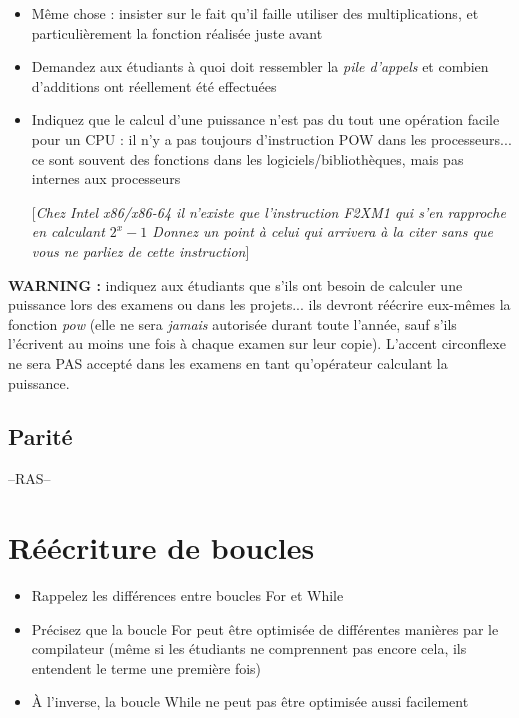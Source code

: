 \documentclass[11pt,a4paper]{article}
\begin{document}
\begin{itemize}
\item Même chose : insister sur le fait qu'il faille utiliser des multiplications, et particulièrement la fonction réalisée juste avant
\item Demandez aux étudiants à quoi doit ressembler la \textit{pile d'appels} et combien d'additions ont réellement été effectuées
\item Indiquez que le calcul d'une puissance n'est pas du tout une opération facile pour un CPU : il n'y a pas toujours d'instruction POW dans les processeurs... ce sont souvent des fonctions dans les logiciels/bibliothèques, mais pas internes aux processeurs

[\textit{Chez Intel x86/x86-64 il n'existe que l'instruction F2XM1 qui s'en rapproche en calculant $ 2^{x} - 1 $ Donnez un point à celui qui arrivera à la citer sans que vous ne parliez de cette instruction}]

\end{itemize}

\bigskip

\textbf{WARNING : } indiquez aux étudiants que s'ils ont besoin de calculer une puissance lors des examens ou dans les projets... ils devront réécrire eux-mêmes la fonction \textit{pow} (elle ne sera \textit{jamais} autorisée durant toute l'année, sauf s'ils l'écrivent au moins une fois à chaque examen sur leur copie).
L'accent circonflexe ne sera PAS accepté dans les examens en tant qu'opérateur calculant la puissance.

\bigskip


\subsection{Parité}

--RAS--

\clearpage


\section{Réécriture de boucles}

\begin{itemize}
\item Rappelez les différences entre boucles For et While
\item Précisez que la boucle For peut être optimisée de différentes manières par le compilateur (même si les étudiants ne comprennent pas encore cela, ils entendent le terme une première fois)
\item \`A l'inverse, la boucle While ne peut pas être optimisée aussi facilement
\end{itemize}
\end{document}
